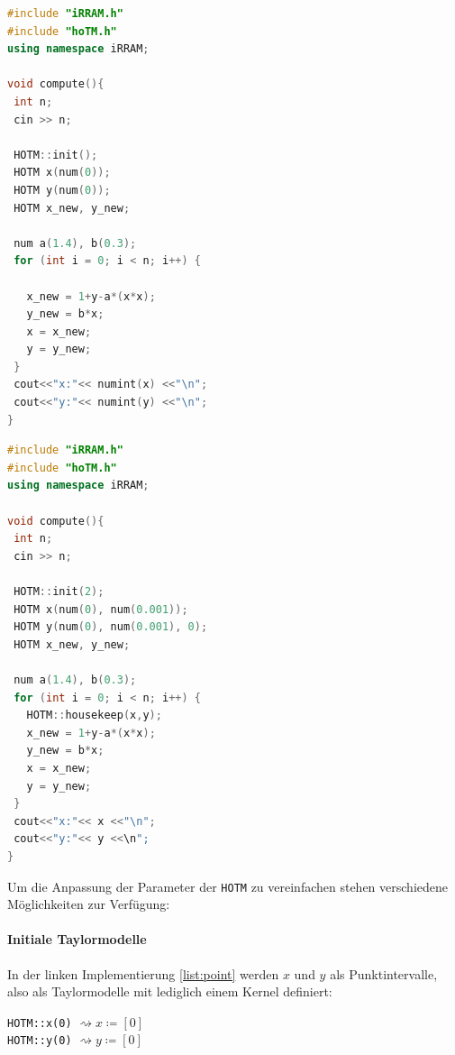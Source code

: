  
 \begin{minipage}{.5\textwidth}
    \begin{lstlisting}[language=C++, style=cpp, caption={[Implementierung der H\e non-Iteration in HOTM mit Punktintervallen] \\Implementierung mit Punktintervallen },label=list:point]
#include "iRRAM.h"
#include "hoTM.h"
using namespace iRRAM;

void compute(){
 int n;
 cin >> n;
 
 HOTM::init();
 HOTM x(num(0));
 HOTM y(num(0));
 HOTM x_new, y_new;
 
 num a(1.4), b(0.3);
 for (int i = 0; i < n; i++) {
 
   x_new = 1+y-a*(x*x);
   y_new = b*x;
   x = x_new;
   y = y_new;
 }
 cout<<"x:"<< numint(x) <<"\n";
 cout<<"y:"<< numint(y) <<"\n";
}
\end{lstlisting}
 \end{minipage}
 \begin{minipage}{.5\textwidth}
    \begin{lstlisting}[language=C++,  style=cpp, caption={[Implementierung der H\e non-Iteration in HOTM mit Intervallen] \\Implementierung mit Intervallen }, label=list:int]  
#include "iRRAM.h"
#include "hoTM.h"
using namespace iRRAM;

void compute(){
 int n;
 cin >> n;
 
 HOTM::init(2);
 HOTM x(num(0), num(0.001));
 HOTM y(num(0), num(0.001), 0);
 HOTM x_new, y_new;
 
 num a(1.4), b(0.3);
 for (int i = 0; i < n; i++) {
   HOTM::housekeep(x,y);
   x_new = 1+y-a*(x*x);
   y_new = b*x;
   x = x_new;
   y = y_new;
 }
 cout<<"x:"<< x <<"\n";
 cout<<"y:"<< y <<\n";
}
\end{lstlisting}
 \end{minipage}

 
 
 Um die Anpassung der Parameter der \verb+HOTM+ zu vereinfachen stehen verschiedene Möglichkeiten zur Verfügung:
 \paragraph{Initiale Taylormodelle}
 In der linken Implementierung \ref{list:point} werden $x$ und $y$ als Punktintervalle, also als Taylormodelle mit lediglich einem Kernel definiert:
  \begin{center}
  \verb+HOTM::x(0)+ $\rightsquigarrow x\coloneqq [0]$\\
  \verb+HOTM::y(0)+ $\rightsquigarrow y\coloneqq [0]$
 \end{center}

